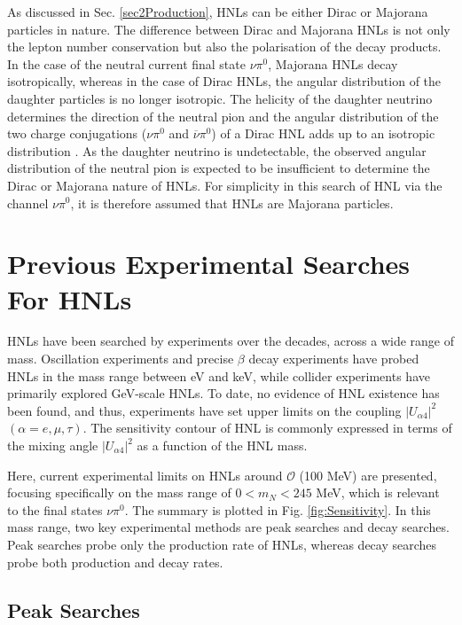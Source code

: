 As discussed in Sec. \ref{sec2Production}, HNLs can be either Dirac or Majorana particles in nature.
The difference between Dirac and Majorana HNLs is not only the lepton number conservation but also the polarisation of the decay products.
In the case of the neutral current final state $\nu\pi^0$, Majorana HNLs decay isotropically, whereas in the case of Dirac HNLs, the angular distribution of the daughter particles is no longer isotropic.
The helicity of the daughter neutrino determines the direction of the neutral pion and the angular distribution of the two charge conjugations ($\nu\pi^{0}$ and $\overline{\nu}\pi^{0}$) of a Dirac HNL adds up to an isotropic distribution  \cite{HNLSilvia}.
As the daughter neutrino is undetectable, the observed angular distribution of the neutral pion is expected to be insufficient to determine the Dirac or Majorana nature of HNLs.
For simplicity in this search of HNL via the channel $\nu\pi^0$, it is therefore assumed that HNLs are Majorana particles.

\section{Previous Experimental Searches For HNLs}
\label{sec2Previous}


HNLs have been searched by experiments over the decades, across a wide range of mass.
Oscillation experiments and precise $\beta$ decay experiments have probed HNLs in the mass range between eV and keV, while collider experiments have primarily explored GeV-scale HNLs.
To date, no evidence of HNL existence has been found, and thus, experiments have set upper limits on the coupling $|U_{\alpha4}|^{2}$ $(\alpha=e,\mu,\tau)$.
The sensitivity contour of HNL is commonly expressed in terms of the mixing angle $|U_{\alpha4}|^{2}$ as a function of the HNL mass.

Here, current experimental limits on HNLs around $\mathcal{O}$ (100 MeV) are presented, focusing specifically on the mass range of $ 0 < m_{N} < 245 $ MeV, which is relevant to the final states $\nu\pi^{0}$.
The summary is plotted in Fig. \ref{fig:Sensitivity}.
In this mass range, two key experimental methods are peak searches and decay searches.
Peak searches probe only the production rate of HNLs, whereas decay searches probe both production and decay rates.


\subsection{Peak Searches}


